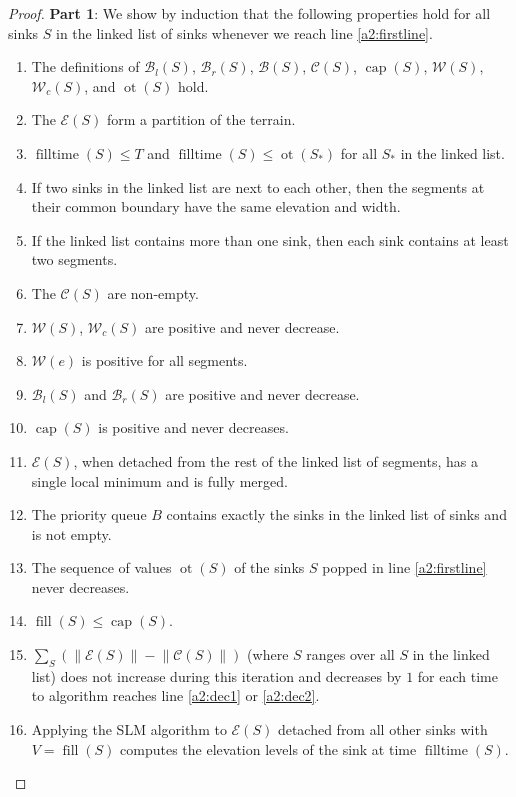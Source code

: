 \documentclass[11pt,a4paper]{article}
\newcommand{\norm}[1]{\left\lVert #1 \right\rVert}
\newcommand{\Br}{\mathcal{B}_r}
\newcommand{\Bl}{\mathcal{B}_l}
\newcommand{\B}{\mathcal{B}}
\newcommand{\Wc}{\mathcal{W}_c}
\newcommand{\W}{\mathcal{W}}
\newcommand{\C}{\mathcal{C}}
\newcommand{\E}{\mathcal{E}}
\DeclareMathOperator{\capp}{cap}
\DeclareMathOperator{\ot}{ot}
\DeclareMathOperator{\Fill}{fill}
\DeclareMathOperator{\filltime}{filltime}
\begin{document}
\begin{proof}
\textbf{Part 1}:
We show by induction that the following properties hold for all sinks $S$ in the linked list of sinks whenever we reach line \ref{a2:firstline}.
\begin{enumerate}[label=\textbf{\Roman*}]
\item The definitions of $\Bl(S)$, $\Br(S)$, $\B(S)$, $\C(S)$, $\capp(S)$, $\W(S)$, $\Wc(S)$, and $\ot(S)$ hold.\label{e1}
\item The $\E(S)$ form a partition of the terrain.\label{e2}
\item $\filltime(S) \le T$ and $\filltime(S) \le \ot(S_*)$ for all $S_*$ in the linked list.\label{e3}
\item If two sinks in the linked list are next to each other, then the segments at their common boundary have the same elevation and width.\label{e4} 
\item If the linked list contains more than one sink, then each sink contains at least two segments.\label{e6}
\item The $\C(S)$ are non-empty.\label{e7}
\item $\W(S)$, $\Wc(S)$ are positive and never decrease.\label{e8}
\item $\W(e)$ is positive for all segments.\label{e9}
\item $\Bl(S)$ and $\Br(S)$ are positive and never decrease.\label{e10}
\item $\capp(S)$ is positive and never decreases.\label{e11}
\item $\E(S)$, when detached from the rest of the linked list of segments, has a single local minimum and is fully merged.\label{e12}
\item The priority queue $B$ contains exactly the sinks in the linked list of sinks and is not empty.\label{e13}
\item The sequence of values $\ot(S)$ of the sinks $S$ popped in line \ref{a2:firstline} never decreases.\label{e15}
\item $\Fill(S) \le \capp(S)$.\label{e16}
\item $\sum_S\left(\norm{\E(S)} - \norm{\C(S)}\right)$ (where $S$ ranges over all $S$ in the linked list) does not increase during this iteration and decreases by $1$ for each time to algorithm reaches line \ref{a2:dec1} or \ref{a2:dec2}.\label{e17}
\item Applying the SLM algorithm to $\E(S)$ detached from all other sinks with $V=\Fill(S)$ computes the elevation levels of the sink at time $\filltime(S)$.\label{e18}
\end{enumerate}


\end{proof}
\end{document}
